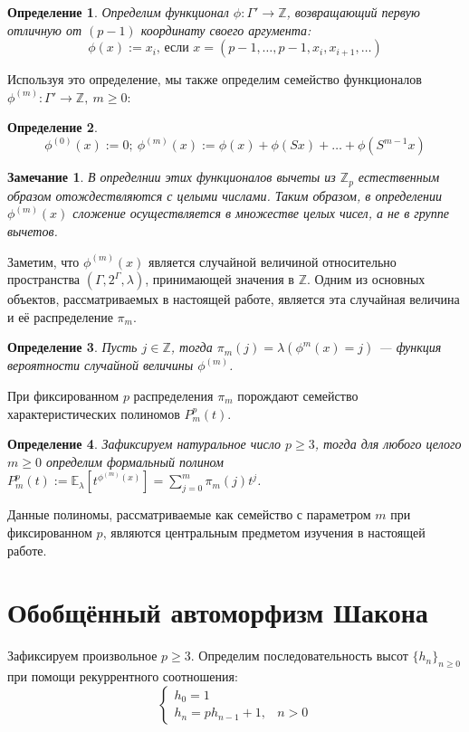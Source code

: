\documentclass[14pt, a4paper, russian]{report}
\newtheorem{remark}{\indent Замечание}
\newtheorem{definition}{\indent Определение}
\begin{document}
\begin{definition}\label{phi}
Определим функционал $\phi: \Gamma' \to \mathbb{Z}$, возвращающий первую отличную от $(p-1)$ координату своего аргумента:
 \[\phi(x):=x_i\text{, если }x=(p-1, \ldots, p-1, x_i, x_{i+1}, \ldots)\]
\end{definition}
 Используя это определение, мы также определим семейство функционалов $\phi^{(m)}: \Gamma' \to \mathbb{Z},\ m \ge 0$:
\begin{definition}\label{phi_m}
    \[\phi^{(0)}(x):=0;\ \phi^{(m)}(x):=\phi(x)+\phi(Sx)+\ldots+\phi(S^{m-1}x)\]
\end{definition}
\begin{remark}
В определнии этих функционалов вычеты из $\mathbb{Z}_p$ естественным образом отождествляются с целыми числами. Таким образом, в определении $\phi^{(m)}(x)$ сложение осуществляется в множестве целых чисел, а не в группе вычетов.
\end{remark}
Заметим, что $\phi^{(m)}(x)$ является случайной величиной относительно пространства $(\Gamma, 2^\Gamma, \lambda)$, принимающей значения в $\mathbb{Z}$. Одним из основных объектов, рассматриваемых в настоящей работе, является эта случайная величина и её распределение $\pi_m$.
\begin{definition}\label{pi_m}
Пусть $j \in \mathbb{Z}$, тогда $\pi_m(j)=\lambda(\phi^{m}(x)=j)$ --- функция вероятности случайной величины $\phi^{(m)}$.
\end{definition}

При фиксированном $p$ распределения $\pi_m$ порождают семейство характеристических полиномов $P_m^p(t)$.

\begin{definition}\label{poly}
Зафиксируем натуральное число $p \ge 3$, тогда для любого целого $m \ge 0$ определим формальный полином $P_m^p(t):= \mathbb{E}_\lambda\left[ t^{\phi^{(m)}(x)}\right] = \sum\limits_{j=0}^m \pi_m(j) t^j$.
\end{definition}

Данные полиномы, рассматриваемые как семейство с параметром $m$ при фиксированном $p$, являются центральным предметом изучения в настоящей работе.

\section{Обобщённый автоморфизм Шакона}

Зафиксируем произвольное $p \ge 3$. Определим последовательность высот $\{h_n\}_{n \ge 0}$ при помощи рекуррентного соотношения:
$$\begin{cases}
h_0 = 1 \\
h_n = ph_{n-1}+1,& n > 0
\end{cases}$$
\end{document}
